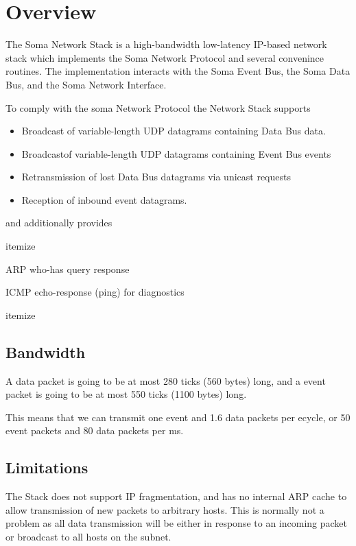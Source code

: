 \section{Overview}

The Soma Network Stack is a high-bandwidth low-latency IP-based
network stack which implements the Soma Network Protocol and several
convenince routines. The implementation interacts with the Soma Event
Bus, the Soma Data Bus, and the Soma Network Interface.

To comply with the soma Network Protocol the Network Stack supports 
\begin{itemize}
\item Broadcast of variable-length UDP datagrams containing Data Bus data. 
\item Broadcastof variable-length UDP datagrams containing Event Bus events
\item Retransmission of lost Data Bus datagrams via unicast requests 
\item Reception of inbound event datagrams. 
\end{itemize}

and additionally provides 
\item{itemize}
\item ARP who-has query response
\item ICMP echo-response (ping) for diagnostics
\item{itemize}

\subsection{Bandwidth}
A data packet is going to be at most 280 ticks (560 bytes) long, and a
event packet is going to be at most 550 ticks (1100 bytes) long.

This means that we can transmit one event and 1.6 data packets per
ecycle, or 50 event packets and 80 data packets per ms.


\subsection{Limitations}
The Stack does not support IP fragmentation, and has no internal ARP
cache to allow transmission of new packets to arbitrary hosts. This is
normally not a problem as all data transmission will be either in
response to an incoming packet or broadcast to all hosts on the
subnet.

